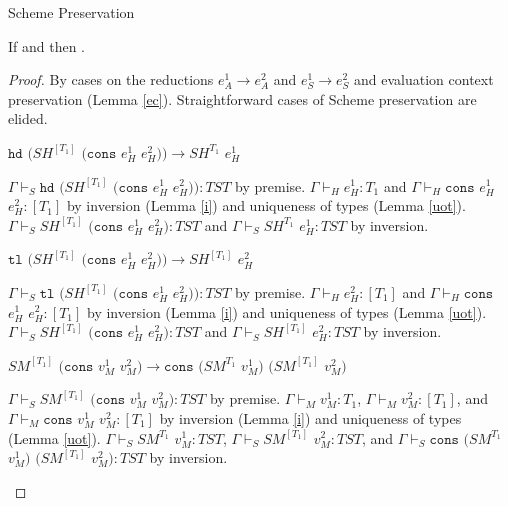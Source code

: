 \begin{theorem}{Scheme Preservation}

\label{thmpns}

If \judes{\env}{\first{\varexps}}{\tytst} and \first{\varexps} \red \second{\varexps} then \judes{\env}{\second{\varexps}}{\tytst}.

\begin{proof}

By cases on the reductions $e_{A}^{1}\rightarrow e_{A}^{2}$ and $e_{S}^{1}\rightarrow e_{S}^{2}$ and evaluation context preservation (Lemma \ref{ec}).  Straightforward cases of Scheme preservation are elided.


\begin{case}
$\mathtt{hd}$ $(SH^{[T_{1}]}$ $(\mathtt{cons}$ $e_{H}^{1}$ $e_{H}^{2}))\rightarrow SH^{T_{1}}$ $e_{H}^{1}$

$\Gamma\vdash_{S}\mathtt{hd}$ $(SH^{[T_{1}]}$ $(\mathtt{cons}$ $e_{H}^{1}$ $e_{H}^{2})):TST$ by premise.  $\Gamma\vdash_{H}e_{H}^{1}:T_{1}$ and $\Gamma\vdash_{H}\mathtt{cons}$ $e_{H}^{1}$ $e_{H}^{2}:[T_{1}]$ by inversion (Lemma \ref{i}) and uniqueness of types (Lemma \ref{uot}).  $\Gamma\vdash_{S}SH^{[T_{1}]}$ $(\mathtt{cons}$ $e_{H}^{1}$ $e_{H}^{2}):TST$ and $\Gamma\vdash_{S}SH^{T_{1}}$ $e_{H}^{1}:TST$ by inversion.
\end{case}


\begin{case}
$\mathtt{tl}$ $(SH^{[T_{1}]}$ $(\mathtt{cons}$ $e_{H}^{1}$ $e_{H}^{2}))\rightarrow SH^{[T_{1}]}$ $e_{H}^{2}$

$\Gamma\vdash_{S}\mathtt{tl}$ $(SH^{[T_{1}]}$ $(\mathtt{cons}$ $e_{H}^{1}$ $e_{H}^{2})):TST$ by premise.  $\Gamma\vdash_{H}e_{H}^{2}:[T_{1}]$ and $\Gamma\vdash_{H}\mathtt{cons}$ $e_{H}^{1}$ $e_{H}^{2}:[T_{1}]$ by inversion (Lemma \ref{i}) and uniqueness of types (Lemma \ref{uot}).  $\Gamma\vdash_{S}SH^{[T_{1}]}$ $(\mathtt{cons}$ $e_{H}^{1}$ $e_{H}^{2}):TST$ and $\Gamma\vdash_{S}SH^{[T_{1}]}$ $e_{H}^{2}:TST$ by inversion.
\end{case}


\begin{case}
$SM^{[T_{1}]}$ $(\mathtt{cons}$ $v_{M}^{1}$ $v_{M}^{2})\rightarrow\mathtt{cons}$ $(SM^{T_{1}}$ $v_{M}^{1})$ $(SM^{[T_{1}]}$ $v_{M}^{2})$

$\Gamma\vdash_{S}SM^{[T_{1}]}$ $(\mathtt{cons}$ $v_{M}^{1}$ $v_{M}^{2}):TST$ by premise.  $\Gamma\vdash_{M}v_{M}^{1}:T_{1}$, $\Gamma\vdash_{M}v_{M}^{2}:[T_{1}]$, and $\Gamma\vdash_{M}\mathtt{cons}$ $v_{M}^{1}$ $v_{M}^{2}:[T_{1}]$ by inversion (Lemma \ref{i}) and uniqueness of types (Lemma \ref{uot}).  $\Gamma\vdash_{S}SM^{T_{1}}$ $v_{M}^{1}:TST$, $\Gamma\vdash_{S}SM^{[T_{1}]}$ $v_{M}^{2}:TST$, and $\Gamma\vdash_{S}\mathtt{cons}$ $(SM^{T_{1}}$ $v_{M}^{1})$ $(SM^{[T_{1}]}$ $v_{M}^{2}):TST$ by inversion.
\end{case}


\end{proof}
\end{theorem}
